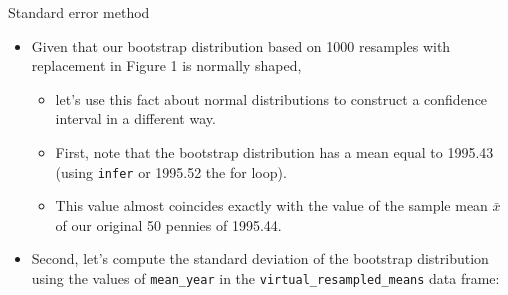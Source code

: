 \documentclass[
  ignorenonframetext,
]{beamer}
\begin{document}
\begin{frame}[fragile]{Standard error method}
\label{standard-error-method}
\begin{itemize}
\item
  Given that our bootstrap distribution based on 1000 resamples with
  replacement in Figure 1 is normally shaped,

  \begin{itemize}
  \item
    let's use this fact about normal distributions to construct a
    confidence interval in a different way.
  \item
    First, note that the bootstrap distribution has a mean equal to
    1995.43 (using \texttt{infer} or 1995.52 the for loop).
  \item
    This value almost coincides exactly with the value of the sample
    mean \(\bar{x}\) of our original 50 pennies of 1995.44.
  \end{itemize}
\item
  Second, let's compute the standard deviation of the bootstrap
  distribution using the values of \texttt{mean\_year} in the
  \texttt{virtual\_resampled\_means} data frame:
\end{itemize}
\end{frame}
\end{document}
